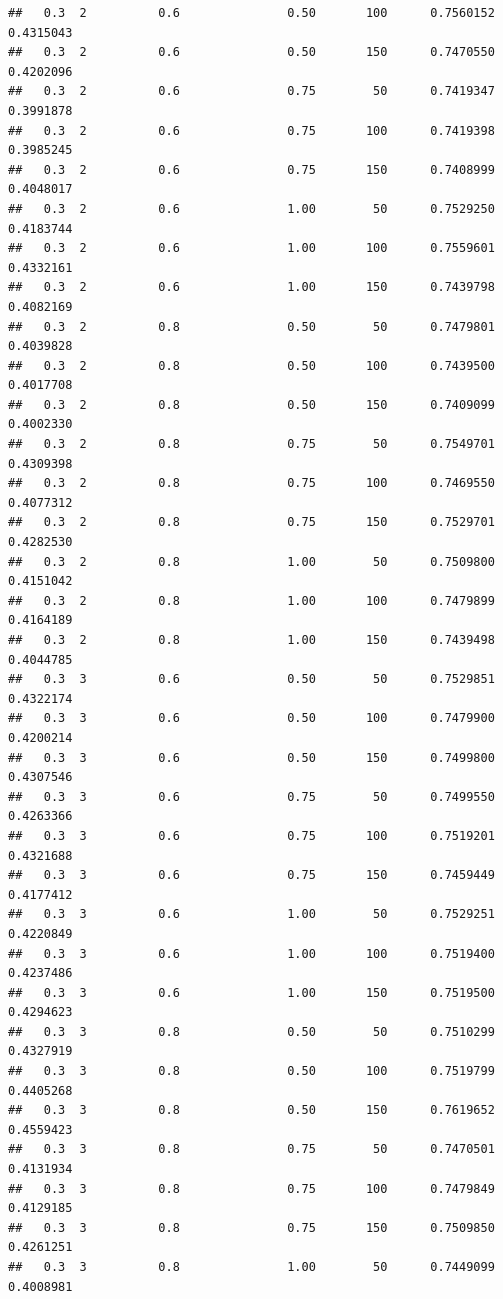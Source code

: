 \documentclass[
  spanish,
]{book}
\theoremstyle{break}
\theoremstyle{definition}
\theoremstyle{definition}
\theoremstyle{definition}
\theoremstyle{remark}
\begin{document}
\begin{verbatim}
##   0.3  2          0.6               0.50       100      0.7560152  0.4315043
##   0.3  2          0.6               0.50       150      0.7470550  0.4202096
##   0.3  2          0.6               0.75        50      0.7419347  0.3991878
##   0.3  2          0.6               0.75       100      0.7419398  0.3985245
##   0.3  2          0.6               0.75       150      0.7408999  0.4048017
##   0.3  2          0.6               1.00        50      0.7529250  0.4183744
##   0.3  2          0.6               1.00       100      0.7559601  0.4332161
##   0.3  2          0.6               1.00       150      0.7439798  0.4082169
##   0.3  2          0.8               0.50        50      0.7479801  0.4039828
##   0.3  2          0.8               0.50       100      0.7439500  0.4017708
##   0.3  2          0.8               0.50       150      0.7409099  0.4002330
##   0.3  2          0.8               0.75        50      0.7549701  0.4309398
##   0.3  2          0.8               0.75       100      0.7469550  0.4077312
##   0.3  2          0.8               0.75       150      0.7529701  0.4282530
##   0.3  2          0.8               1.00        50      0.7509800  0.4151042
##   0.3  2          0.8               1.00       100      0.7479899  0.4164189
##   0.3  2          0.8               1.00       150      0.7439498  0.4044785
##   0.3  3          0.6               0.50        50      0.7529851  0.4322174
##   0.3  3          0.6               0.50       100      0.7479900  0.4200214
##   0.3  3          0.6               0.50       150      0.7499800  0.4307546
##   0.3  3          0.6               0.75        50      0.7499550  0.4263366
##   0.3  3          0.6               0.75       100      0.7519201  0.4321688
##   0.3  3          0.6               0.75       150      0.7459449  0.4177412
##   0.3  3          0.6               1.00        50      0.7529251  0.4220849
##   0.3  3          0.6               1.00       100      0.7519400  0.4237486
##   0.3  3          0.6               1.00       150      0.7519500  0.4294623
##   0.3  3          0.8               0.50        50      0.7510299  0.4327919
##   0.3  3          0.8               0.50       100      0.7519799  0.4405268
##   0.3  3          0.8               0.50       150      0.7619652  0.4559423
##   0.3  3          0.8               0.75        50      0.7470501  0.4131934
##   0.3  3          0.8               0.75       100      0.7479849  0.4129185
##   0.3  3          0.8               0.75       150      0.7509850  0.4261251
##   0.3  3          0.8               1.00        50      0.7449099  0.4008981

\end{verbatim}
\end{document}
